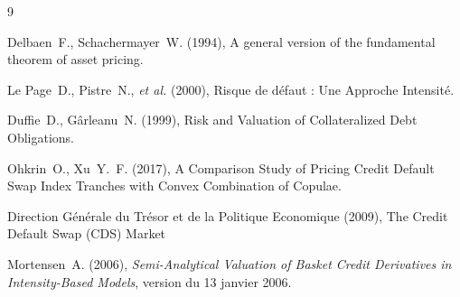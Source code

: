 \begin{thebibliography}{9}

Delbaen~F., Schachermayer~W. (1994),
\newblock A general version of the fundamental theorem of asset pricing.

Le Page~D., Pistre~N., \emph{et al.} (2000),
\newblock Risque de défaut : Une Approche Intensité.

Duffie~D., Gârleanu~N. (1999),
\newblock Risk and Valuation of Collateralized Debt Obligations.

Ohkrin~O., Xu~Y.~F. (2017),
\newblock A Comparison Study of Pricing Credit Default Swap Index Tranches with
Convex Combination of Copulae.

Direction Générale du Trésor et de la Politique Economique (2009),
\newblock The Credit Default Swap (CDS) Market

Mortensen~A. (2006),
\newblock \textit{Semi-Analytical Valuation of Basket Credit Derivatives in Intensity-Based Models},
\newblock version du 13 janvier 2006.

\end{thebibliography}
